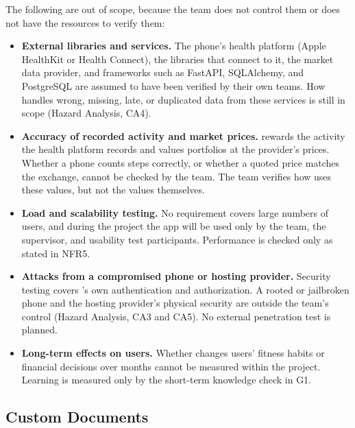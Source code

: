 \documentclass[12pt, titlepage]{article}
\begin{document}
The following are out of scope, because the team does not control them or does
not have the resources to verify them:

\begin{itemize}
  \item \textbf{External libraries and services.} The phone's health platform
    (Apple HealthKit or Health Connect), the libraries that connect to it, the
    market data provider, and frameworks such as FastAPI, SQLAlchemy, and
    PostgreSQL are assumed to have been verified by their own teams. How
    \progname{} handles wrong, missing, late, or duplicated data from these
    services is still in scope (Hazard Analysis, CA4).
  \item \textbf{Accuracy of recorded activity and market prices.}
    \progname{} rewards the activity the health platform records and values
    portfolios at the provider's prices. Whether a phone counts steps
    correctly, or whether a quoted price matches the exchange, cannot be
    checked by the team. The team verifies how \progname{} uses these values,
    but not the values themselves.
  \item \textbf{Load and scalability testing.} No requirement covers large
    numbers of users, and during the project the app will be used only by the
    team, the supervisor, and usability test participants. Performance is
    checked only as stated in NFR5.
  \item \textbf{Attacks from a compromised phone or hosting provider.}
    Security testing covers \progname{}'s own authentication and
    authorization. A rooted or jailbroken phone and the hosting provider's
    physical security are outside the team's control (Hazard Analysis, CA3 and
    CA5). No external penetration test is planned.
  \item \textbf{Long-term effects on users.} Whether \progname{} changes users'
    fitness habits or financial decisions over months cannot be measured within
    the project. Learning is measured only by the short-term knowledge check in
    G1.
\end{itemize}

\subsection{Custom Documents}

\end{document}
